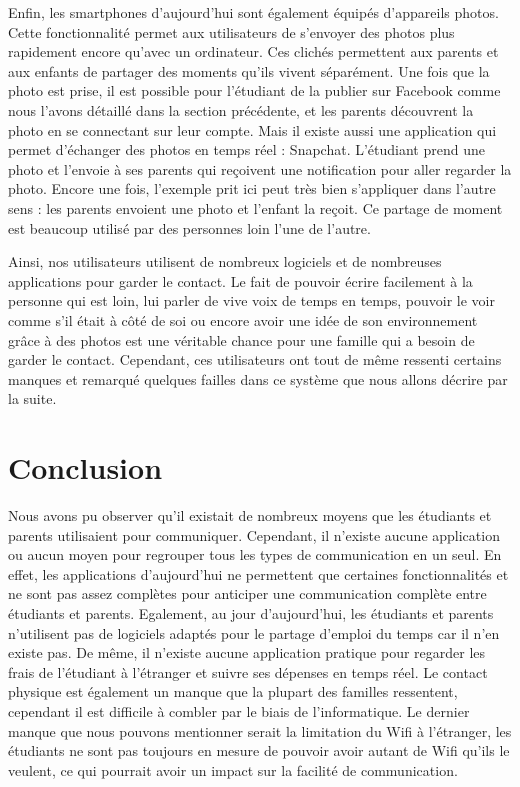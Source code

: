 \documentclass[12pt]{article}
\begin{document}
Enfin, les smartphones d'aujourd'hui sont également équipés d'appareils photos. Cette fonctionnalité permet aux utilisateurs de s'envoyer des photos plus rapidement encore qu'avec un ordinateur. Ces clichés permettent aux parents et aux enfants de partager des moments qu'ils vivent séparément. Une fois que la photo est prise, il est possible pour l'étudiant de la publier sur Facebook comme nous l'avons détaillé dans la section précédente, et les parents découvrent la photo en se connectant sur leur compte. Mais il existe aussi une application qui permet d'échanger des photos en temps réel : Snapchat. L'étudiant prend une photo et l'envoie à ses parents qui reçoivent une notification pour aller regarder la photo. Encore une fois, l'exemple prit ici peut très bien s'appliquer dans l'autre sens : les parents envoient une photo et l'enfant la reçoit. Ce partage de moment est beaucoup utilisé par des personnes loin l'une de l'autre. 

Ainsi, nos utilisateurs utilisent de nombreux logiciels et de nombreuses applications pour garder le contact. Le fait de pouvoir écrire facilement à la personne qui est loin, lui parler de vive voix de temps en temps, pouvoir le voir comme s'il était à côté de soi ou encore avoir une idée de son environnement grâce à des photos est une véritable chance pour une famille qui a besoin de garder le contact. Cependant, ces utilisateurs ont tout de même ressenti certains manques et remarqué quelques failles dans ce système que nous allons décrire par la suite.


\section{Conclusion}

Nous avons pu observer qu’il existait de nombreux moyens que les étudiants et parents utilisaient pour communiquer. Cependant, il n’existe aucune application ou aucun moyen pour regrouper tous les types de communication en un seul. En effet, les applications d’aujourd’hui ne permettent que certaines fonctionnalités et ne sont pas assez complètes pour anticiper une communication complète entre étudiants et parents.
Egalement, au jour d’aujourd’hui, les étudiants et parents n’utilisent pas de logiciels adaptés pour le partage d’emploi du temps car il n’en existe pas. De même, il n’existe aucune application pratique pour regarder les frais de l’étudiant à l’étranger et suivre ses dépenses en temps réel.
Le contact physique est également un manque que la plupart des familles ressentent, cependant il est difficile à combler par le biais de l’informatique.
Le dernier manque que nous pouvons mentionner serait la limitation du Wifi à l’étranger, les étudiants ne sont pas toujours en mesure de pouvoir avoir autant de Wifi qu’ils le veulent, ce qui pourrait avoir un impact sur la facilité de communication.
\end{document}
